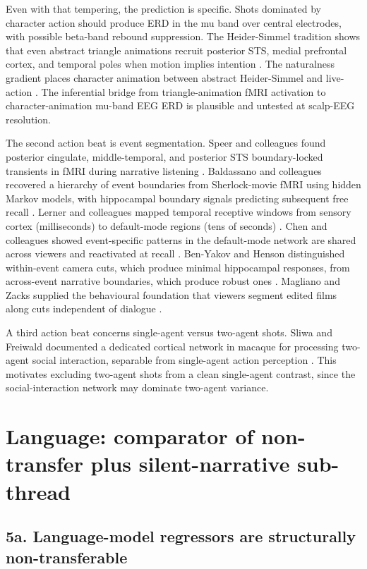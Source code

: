 \documentclass[preprint,12pt]{elsarticle}
\begin{document}
Even with that tempering, the prediction is specific. Shots dominated by character action should produce ERD in the mu band over central electrodes, with possible beta-band rebound suppression. The Heider-Simmel tradition shows that even abstract triangle animations recruit posterior STS, medial prefrontal cortex, and temporal poles when motion implies intention \cite{castelli2000heider}. The naturalness gradient places character animation between abstract Heider-Simmel and live-action \cite{hasson2010natural}. The inferential bridge from triangle-animation fMRI activation to character-animation mu-band EEG ERD is plausible and untested at scalp-EEG resolution.

The second action beat is event segmentation. Speer and colleagues found posterior cingulate, middle-temporal, and posterior STS boundary-locked transients in fMRI during narrative listening \cite{speer2007narrative}. Baldassano and colleagues recovered a hierarchy of event boundaries from Sherlock-movie fMRI using hidden Markov models, with hippocampal boundary signals predicting subsequent free recall \cite{baldassano2017event}. Lerner and colleagues mapped temporal receptive windows from sensory cortex (milliseconds) to default-mode regions (tens of seconds) \cite{lerner2011temporal}. Chen and colleagues showed event-specific patterns in the default-mode network are shared across viewers and reactivated at recall \cite{chen2017shared}. Ben-Yakov and Henson distinguished within-event camera cuts, which produce minimal hippocampal responses, from across-event narrative boundaries, which produce robust ones \cite{Ben-Yakov2018TheHF}. Magliano and Zacks supplied the behavioural foundation that viewers segment edited films along cuts independent of dialogue \cite{Magliano2011TheIO}.

A third action beat concerns single-agent versus two-agent shots. Sliwa and Freiwald documented a dedicated cortical network in macaque for processing two-agent social interaction, separable from single-agent action perception \cite{sliwa2017macaque}. This motivates excluding two-agent shots from a clean single-agent contrast, since the social-interaction network may dominate two-agent variance.

\section{Language: comparator of non-transfer plus silent-narrative sub-thread}

\subsection{5a. Language-model regressors are structurally non-transferable}
\end{document}
